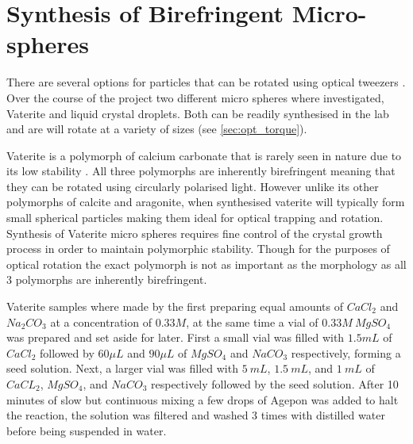 \section{Synthesis of Birefringent Micro-spheres}
\label{sec:vaterite}
There are several options for particles that can be rotated 
using optical tweezers \cite{Parkin2009, Saito2022}. Over 
the course of the project two different micro spheres where 
investigated, Vaterite and liquid crystal droplets. Both can 
be readily synthesised in the lab and are will rotate at a 
variety of sizes (see \ref{sec:opt_torque}).

Vaterite is a polymorph of calcium carbonate that is rarely 
seen in nature due to its low stability \cite{KonopackaLyskawa2019}. 
All three polymorphs are inherently birefringent meaning 
that they can be rotated using circularly polarised light. 
However unlike its other polymorphs of calcite and aragonite, 
when synthesised vaterite will typically form small spherical 
particles making them ideal for optical trapping and rotation. 
Synthesis of Vaterite micro spheres requires fine control of 
the crystal growth process in order to maintain polymorphic 
stability. Though for the purposes of optical rotation the 
exact polymorph is not as important as the morphology as all 
3 polymorphs are inherently birefringent. 

Vaterite samples where made by the first preparing equal amounts 
of $CaCl_2$ and $Na_2CO_3$ at a concentration of $0.33M$, at 
the same time a vial of $0.33M\ MgSO_4$ was prepared and set 
aside for later. First a small vial was filled with $1.5mL$ of 
$CaCl_2$ followed by $60\mu L$ and $90\mu L$ of $MgSO_4$ and 
$NaCO_3$ respectively, forming a seed solution. Next, a larger 
vial was filled with $5\ mL$, $1.5\ mL$, and $1\ mL$ of $CaCL_2$, 
$MgSO_4$, and $NaCO_3$ respectively followed by the seed solution. 
After 10 minutes of slow but continuous mixing a few drops of 
Agepon was added to halt the reaction, the solution was filtered 
and washed 3 times with distilled water before being suspended 
in water.
 
